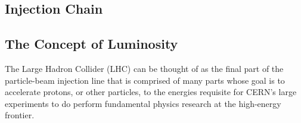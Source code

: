 \subsection{Injection Chain}
\label{sec:lhc_injection}

\subsection{The Concept of Luminosity}
\label{sec:lhc_luminosity}

The Large Hadron Collider (LHC) can be thought of as the final part of the particle-beam injection line
that is comprised of many parts whose goal is to accelerate protons, or other particles, to
the energies requisite for CERN's large experiments to do perform fundamental physics research
at the high-energy frontier.
